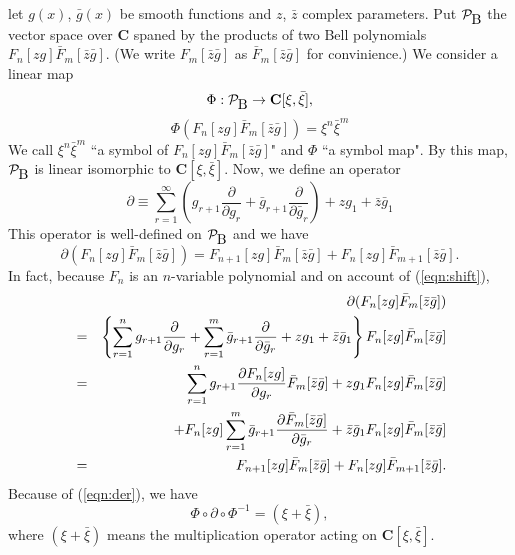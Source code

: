 \documentclass[makeidx,12pt,openany]{report}
\begin{document}
let $g(x)$, $\bar{g}(x)$ be smooth functions and $z$, 
$\bar{z}$ complex parameters. 
Put $\cal{P}_{\mbox{B}}$ the vector space over $\mathbf{C}$ spaned by 
the products of two Bell polynomials $F_n[zg]\bar{F}_m[\bar{z}\bar{g}]$. 
(We write $F_m[\bar{z}\bar{g}]$ as $\bar{F}_m[\bar{z}\bar{g}]$ 
for convinience.) 
We consider a linear map 
\begin{equation}
 \Phi : \cal{P}_{\mbox{B}}
   \rightarrow 
   \mathbf{C}[\xi, \bar{\xi}], 
\end{equation}
\begin{equation}
 \Phi (F_n[zg]\bar{F}_m[\bar{z}\bar{g}])=\xi^n \bar{\xi}^m
\end{equation}
We call $\xi^n \bar{\xi}^m$ ``a symbol of $F_n[zg]\bar{F}_m[\bar{z}\bar{g}]$" 
and  \index{$\Phi $}
$\Phi $ ``a symbol map". 
By this map, $\cal{P}_{\mbox{B}}$ is linear isomorphic to 
$\mathbf{C}[\xi, \bar{\xi}]$. 
Now, we define an operator 
\begin{equation}
 \partial \equiv 
     \sum_{r=1}^{\infty} 
     \left( 
       g_{r+1} \frac{\partial}{\partial g_r}
      + \bar{g}_{r+1} \frac{\partial}{\partial \bar{g}_r}
     \right)
     +zg_1+\bar{z}\bar{g}_1
\end{equation}
This operator is well-defined on $\cal{P}_{\mbox{B}}$ and we have
\begin{equation}
 \partial (F_n[zg]\bar{F}_m[\bar{z}\bar{g}])
 = F_{n+1}[zg]\bar{F}_m[\bar{z}\bar{g}]
  +F_n[zg]\bar{F}_{m+1}[\bar{z}\bar{g}].
 \label{eqn:der}
\end{equation}
In fact, because $F_n$ is an $n$-variable polynomial and 
on account of (\ref{eqn:shift}), 
\begin{eqnarray}
 && \hspace{-5mm} 
    \partial (F_n[zg]\bar{F}_m[\bar{z}\bar{g}]) \nonumber\\
 &=& \left\{
      \sum_{r=1}^n
        g_{r+1} \frac{\partial}{\partial g_r}
      +\sum_{r=1}^m
        \bar{g}_{r+1} \frac{\partial}{\partial \bar{g}_r}
      +zg_1+\bar{z}\bar{g}_1
     \right\}
     F_n[zg]\bar{F}_m[\bar{z}\bar{g}] \label{eqn:welldef}\\
 &=&  \sum_{r=1}^n
        g_{r+1} \frac{\partial F_n[zg]}{\partial g_r}\bar{F}_m[\bar{z}\bar{g}]
       +zg_1 F_n[zg]\bar{F}_m[\bar{z}\bar{g}] \nonumber\\
  && \quad 
      +F_n[zg] 
       \sum_{r=1}^m
         \bar{g}_{r+1} 
        \frac{\partial \bar{F}_m[\bar{z}\bar{g}]}{\partial \bar{g}_r}
      +\bar{z}\bar{g}_1 F_n[zg]\bar{F}_m[\bar{z}\bar{g}] \nonumber\\
 &=&  F_{n+1}[zg]\bar{F}_m[\bar{z}\bar{g}]
     +F_n[zg]\bar{F}_{m+1}[\bar{z}\bar{g}]. \nonumber
\end{eqnarray}
Because of (\ref{eqn:der}), we have
\begin{equation}
 \Phi \circ \partial \circ \Phi^{-1} 
 = (\xi + \bar{\xi} ),
\end{equation}
where $(\xi + \bar{\xi} )$ means the multiplication operator acting on 
$\mathbf{C}[\xi, \bar{\xi}]$. 
\end{document}
